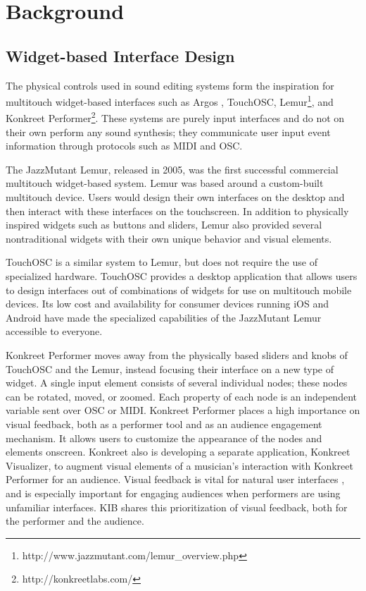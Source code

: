 \documentclass{nime-alternate}
\begin{document}
\section{Background}
\subsection{Widget-based Interface Design}
The physical controls used in sound editing systems form the inspiration for multitouch
widget-based interfaces such as Argos \cite{diakopoulos2010argos}, TouchOSC, 
Lemur\footnote{http://www.jazzmutant.com/lemur\_overview.php}, and Konkreet Performer\footnote{http://konkreetlabs.com/}. These systems are purely
input interfaces and do not on their own perform any sound synthesis; they communicate user input event information through
protocols such as MIDI and OSC\cite{osc}.

The JazzMutant Lemur, released in 2005, was the
first successful commercial multitouch widget-based system. Lemur was based around a custom-built multitouch device. Users would design their own interfaces
on the desktop and then interact with these interfaces on the touchscreen. In
addition to physically inspired widgets such as buttons and sliders, Lemur also provided
several nontraditional widgets with their own unique behavior and visual elements. 

TouchOSC is a similar system to Lemur, but does not require the use of specialized hardware.
TouchOSC provides a desktop
application that allows users to design interfaces out of combinations of widgets for use on
multitouch mobile devices. Its low cost and availability for consumer devices running iOS and Android have
made the specialized capabilities of the JazzMutant Lemur accessible to everyone.

Konkreet Performer moves away from the physically based sliders and knobs of TouchOSC and the
Lemur, instead focusing their interface on a new type of widget. A single input element consists of several
individual nodes; these nodes can be rotated, moved, or zoomed. Each property of each node is an independent variable sent over OSC or MIDI. Konkreet Performer places a high importance on visual feedback, both
as a performer tool and as an audience engagement mechanism. It allows users to 
customize the appearance of the nodes and elements onscreen. Konkreet also is developing a 
separate application, Konkreet Visualizer, to augment visual elements of a musician's interaction with Konkreet Performer for an audience. Visual feedback is
vital for natural user interfaces \cite{bravenuiworld}, and is especially important for engaging audiences when performers are using unfamiliar interfaces. KIB shares this prioritization of visual feedback, both for the performer and the audience. 
\end{document}
